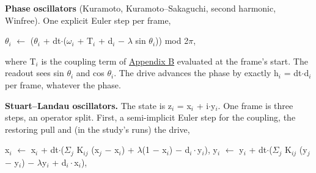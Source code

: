 \documentclass{article}
\begin{document}
\textbf{Phase oscillators} (Kuramoto, Kuramoto--Sakaguchi, second
harmonic, Winfree). One explicit Euler step per frame,

\ensuremath{\theta_{i}} \ensuremath{\leftarrow} (\ensuremath{\theta_{i}}
+ dt\ensuremath{\cdot}(\ensuremath{\omega_{i}} + T\ensuremath{_{i}} +
d\ensuremath{_{i}} \ensuremath{-} \ensuremath{\lambda} sin
\ensuremath{\theta_{i}})) mod 2\ensuremath{\pi},

where T\ensuremath{_{i}} is the coupling term of
\hyperref[sec-B]{Appendix B} evaluated at the frame's start. The readout
sees sin \ensuremath{\theta_{i}} and cos \ensuremath{\theta_{i}}. The
drive advances the phase by exactly h\ensuremath{_{i}} =
dt\ensuremath{\cdot}d\ensuremath{_{i}} per frame, whatever the phase.

\textbf{Stuart--Landau oscillators.} The state is z\ensuremath{_{i}} =
x\ensuremath{_{i}} + i\ensuremath{\cdot}y\ensuremath{_{i}}. One frame is
three steps, an operator split. First, a semi-implicit Euler step for
the coupling, the restoring pull and (in the study's runs) the drive,

x\ensuremath{_{i}} \ensuremath{\leftarrow} x\ensuremath{_{i}} +
dt\ensuremath{\cdot}(\ensuremath{\Sigma_{j}} K\ensuremath{_{ij}}
(x\ensuremath{_{j}} \ensuremath{-} x\ensuremath{_{i}}) +
\ensuremath{\lambda}(1 \ensuremath{-} x\ensuremath{_{i}}) \ensuremath{-}
d\ensuremath{_{i}\cdot}y\ensuremath{_{i}}), y\ensuremath{_{i}}
\ensuremath{\leftarrow} y\ensuremath{_{i}} +
dt\ensuremath{\cdot}(\ensuremath{\Sigma_{j}} K\ensuremath{_{ij}}
(y\ensuremath{_{j}} \ensuremath{-} y\ensuremath{_{i}}) \ensuremath{-}
\ensuremath{\lambda}y\ensuremath{_{i}} +
d\ensuremath{_{i}\cdot}x\ensuremath{_{i}}),
\end{document}
